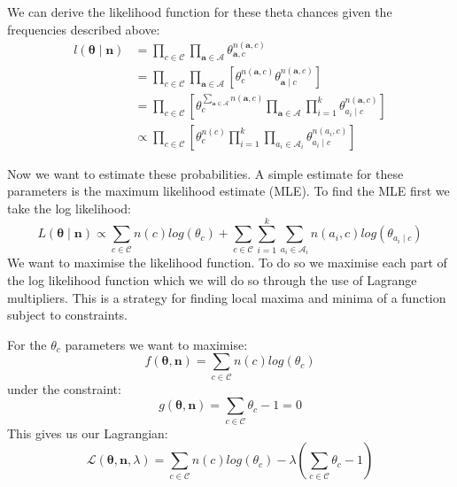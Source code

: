We can derive the likelihood function for these theta chances given the frequencies described above:
\begin{align} \label{likelihood}
	l(\mathbf{\theta} \mid \mathbf{n}) & =  \prod_{c \in \mathcal{C}} \prod_{\mathbf{a} \in \mathbf{\mathcal{A}}} \theta_{\mathbf{a}, c}^{n(\mathbf{a}, c)} \\
	& = \prod_{c \in \mathcal{C}} \prod_{\mathbf{a} \in \mathbf{\mathcal{A}}} \left[ \theta_{c}^{n(\mathbf{a}, c)} \theta_{\mathbf{a} \mid c}^{n(\mathbf{a}, c)} \right] \\
	& = \prod_{c \in \mathcal{C}} \left[ \theta_{c}^{\sum_{\mathbf{a} \in \mathbf{\mathcal{A}}} n(\mathbf{a}, c)} \prod_{\mathbf{a} \in \mathbf{\mathcal{A}}} \prod_{i=1}^k \theta_{a_i \mid c}^{n(\mathbf{a}, c)} \right] \\
	& \propto \prod_{c \in \mathcal{C}} \left[ \theta_c^{n(c)} \prod_{i=1}^k \prod_{a_i \in \mathcal{A}_i} \theta_{a_i \mid c}^{n(a_i, c)} \right]
\end{align}

Now we want to estimate these probabilities.
A simple estimate for these parameters is the maximum likelihood estimate (MLE).
To find the MLE first we take the log likelihood:
\begin{equation}
	L(\mathbf{\theta} \mid \mathbf{n}) \propto \sum_{c \in \mathcal{C}}  n(c)log(\theta_c) + \sum_{c \in \mathcal{C}} \sum_{i=1}^k \sum_{a_i \in \mathcal{A}_i} n(a_i, c) log(\theta_{a_i \mid c}) 
\end{equation}
We want to maximise the likelihood function.
To do so we maximise each part of the log likelihood function which we will do so through the use of Lagrange multipliers.
This is a strategy for finding local maxima and minima of a function subject to constraints.

For the $\theta_c$ parameters we want to maximise:
\begin{equation}
	f(\mathbf{\theta}, \mathbf{n}) = \sum_{c \in \mathcal{C}}  n(c)log(\theta_c)
\end{equation}
under the constraint:
\begin{equation}\label{theta_c constraint}
	g(\mathbf{\theta}, \mathbf{n}) = \sum_{c \in \mathcal{C}}  \theta_c - 1 = 0
\end{equation}
This gives us our Lagrangian:
\begin{equation}
	\mathcal{L}(\mathbf{\theta}, \mathbf{n}, \lambda) = \sum_{c \in \mathcal{C}}  n(c)log(\theta_c) - \lambda(\sum_{c \in \mathcal{C}}  \theta_c - 1)
\end{equation}

